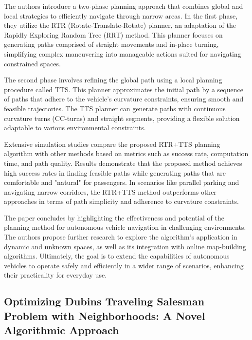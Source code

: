 The authors introduce a two-phase planning approach that combines global and local strategies to efficiently navigate through narrow areas. In the first phase, they utilize the RTR (Rotate-Translate-Rotate) planner, an adaptation of the Rapidly Exploring Random Tree (RRT) method. This planner focuses on generating paths comprised of straight movements and in-place turning, simplifying complex maneuvering into manageable actions suited for navigating constrained spaces.

\vspace*{6mm}

The second phase involves refining the global path using a local planning procedure called TTS. This planner approximates the initial path by a sequence of paths that adhere to the vehicle's curvature constraints, ensuring smooth and feasible trajectories. The TTS planner can generate paths with continuous curvature turns (CC-turns) and straight segments, providing a flexible solution adaptable to various environmental constraints.

\vspace*{6mm}

Extensive simulation studies compare the proposed RTR+TTS planning algorithm with other methods based on metrics such as success rate, computation time, and path quality. Results demonstrate that the proposed method achieves high success rates in finding feasible paths while generating paths that are comfortable and "natural" for passengers. In scenarios like parallel parking and navigating narrow corridors, the RTR+TTS method outperforms other approaches in terms of path simplicity and adherence to curvature constraints.

\vspace*{6mm}

The paper concludes by highlighting the effectiveness and potential of the planning method for autonomous vehicle navigation in challenging environments. The authors propose further research to explore the algorithm's application in dynamic and unknown spaces, as well as its integration with online map-building algorithms. Ultimately, the goal is to extend the capabilities of autonomous vehicles to operate safely and efficiently in a wider range of scenarios, enhancing their practicality for everyday use.


\subsection{Optimizing Dubins Traveling Salesman Problem with Neighborhoods: A Novel Algorithmic Approach}


